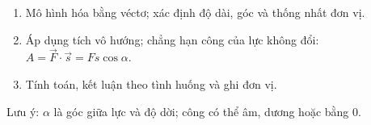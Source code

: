 \begin{enumerate}
\item Mô hình hóa bằng véctơ; xác định độ dài, góc và thống nhất đơn vị.
\item Áp dụng tích vô hướng; chẳng hạn công của lực không đổi: $A=\overrightarrow{F}\cdot\overrightarrow{s}=Fs\cos\alpha$.
\item Tính toán, kết luận theo tình huống và ghi đơn vị.
\end{enumerate}
Lưu ý: $\alpha$ là góc giữa lực và độ dời; công có thể âm, dương hoặc bằng $0$.
